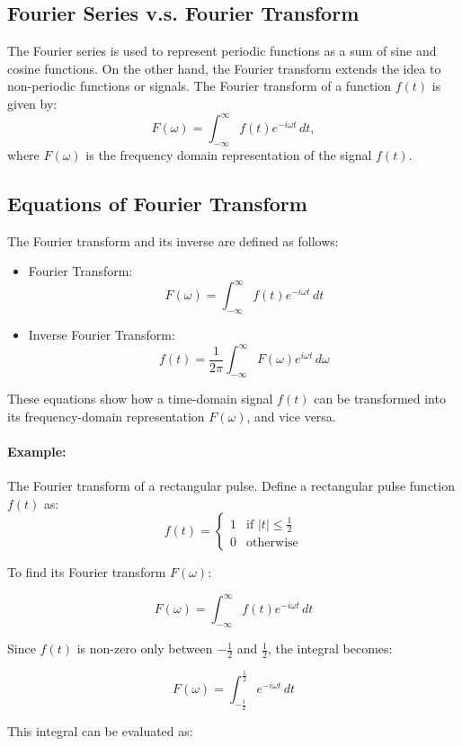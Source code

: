 \subsection{Fourier Series v.s. Fourier Transform}

The Fourier series is used to represent periodic functions as a sum of sine and cosine functions. On the other hand, the Fourier transform extends the idea to non-periodic functions or signals. The Fourier transform of a function \( f(t) \) is given by:
\[ F(\omega) = \int_{-\infty}^{\infty} f(t) e^{-i \omega t} \, dt, \]
where \( F(\omega) \) is the frequency domain representation of the signal \( f(t) \).

\subsection{Equations of Fourier Transform}
The Fourier transform and its inverse are defined as follows:
\begin{itemize}
	\item Fourier Transform:
	\[ F(\omega) = \int_{-\infty}^{\infty} f(t) e^{-i \omega t} \, dt \]
	\item Inverse Fourier Transform:
	\[ f(t) = \frac{1}{2\pi} \int_{-\infty}^{\infty} F(\omega) e^{i \omega t} \, d\omega \]
\end{itemize}
These equations show how a time-domain signal \( f(t) \) can be transformed into its frequency-domain representation \( F(\omega) \), and vice versa.

\paragraph{Example: }The Fourier transform of a rectangular pulse.
Define a rectangular pulse function \( f(t) \) as:
\[ f(t) = \begin{cases} 
1 & \text{if } |t| \leq \frac{1}{2} \\
0 & \text{otherwise} 
\end{cases} \]

To find its Fourier transform \( F(\omega) \):

\[ F(\omega) = \int_{-\infty}^{\infty} f(t) e^{-i \omega t} \, dt \]

Since \( f(t) \) is non-zero only between \( -\frac{1}{2} \) and \( \frac{1}{2} \), the integral becomes:

\[ F(\omega) = \int_{-\frac{1}{2}}^{\frac{1}{2}} e^{-i \omega t} \, dt \]

This integral can be evaluated as:

